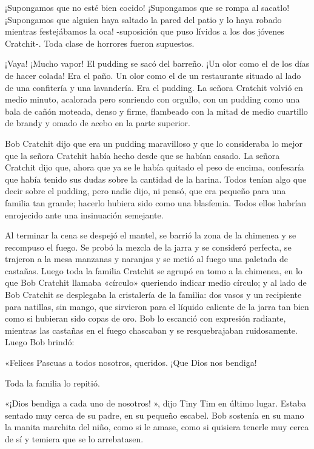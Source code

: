 \documentclass{novela}
\begin{document}
 ¡Supongamos que no esté bien cocido! ¡Supongamos que se rompa al sacatlo! ¡Supongamos que alguien haya saltado la pared del patio y lo haya robado mientras festejábamos la oca! -suposición que puso lívidos a los dos jóvenes Cratchit-. Toda clase de horrores fueron supuestos.

 ¡Vaya! ¡Mucho vapor! El pudding se sacó del barreño. ¡Un olor como el de los días de hacer colada! Era el paño. Un olor como el de un restaurante situado al lado de una confitería y una lavandería. Era el pudding. La señora Cratchit volvió en medio minuto, acalorada pero sonriendo con orgullo, con un pudding como una bala de cañón moteada, denso y firme, flambeado con la mitad de medio cuartillo de brandy y omado de acebo en la parte superior.

 Bob Cratchit dijo que era un pudding maravilloso y que lo consideraba lo mejor que la señora Cratchit había hecho desde que se habían casado. La señora Cratchit dijo que, ahora que ya se le había quitado el peso de encima, confesaría que había tenido sus dudas sobre la cantidad de la harina. Todos tenían algo que decir sobre el pudding, pero nadie dijo, ni pensó, que era pequeño para una familia tan grande; hacerlo hubiera sido como una blasfemia. Todos ellos habrían enrojecido ante una insinuación semejante.

 Al terminar la cena se despejó el mantel, se barrió la zona de la chimenea y se recompuso el fuego. Se probó la mezcla de la jarra y se consideró perfecta, se trajeron a la mesa manzanas y naranjas y se metió al fuego una paletada de castañas. Luego toda la familia Cratchit se agrupó en tomo a la chimenea, en lo que Bob Cratchit llamaba «círculo» queriendo indicar medio círculo; y al lado de Bob Cratchit se desplegaba la cristalería de la familia: dos vasos y un recipiente para natillas, sin mango, que sirvieron para el líquido caliente de la jarra tan bien como si hubieran sido copas de oro. Bob lo escanció con expresión radiante, mientras las castañas en el fuego chascaban y se resquebrajaban ruidosamente. Luego Bob brindó:

 «Felices Pascuas a todos nosotros, queridos. ¡Que Dios nos bendiga!

 Toda la familia lo repitió.

 «¡Dios bendiga a cada uno de nosotros! », dijo Tiny Tim en último lugar. Estaba sentado muy cerca de su padre, en su pequeño escabel. Bob sostenía en su mano la manita marchita del niño, como si le amase, como si quisiera tenerle muy cerca de sí y temiera que se lo arrebatasen.
\end{document}
